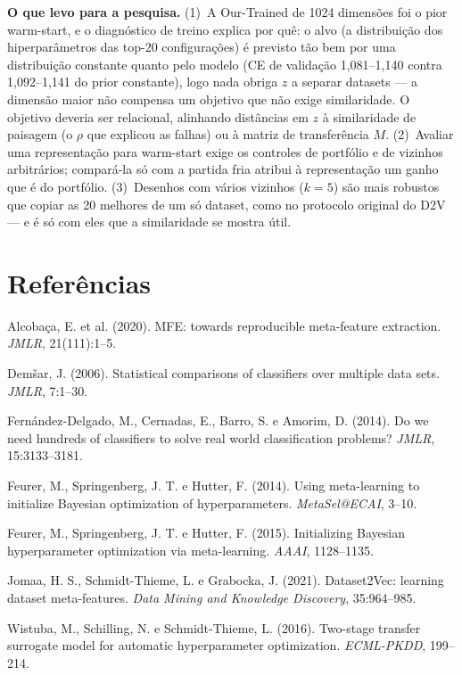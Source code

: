 \documentclass[10pt,a4paper]{article}
\begin{document}
\textbf{O que levo para a pesquisa.} (1)~A Our-Trained de 1024 dimensões foi o pior warm-start, e o diagnóstico de treino explica
por quê: o alvo (a distribuição dos hiperparâmetros das top-20 configurações) é previsto tão bem por uma distribuição constante
quanto pelo modelo (CE de validação 1,081--1,140 contra 1,092--1,141 do prior constante), logo nada obriga $z$ a separar datasets
--- a dimensão maior não compensa um objetivo que não exige similaridade. O objetivo deveria ser relacional, alinhando distâncias
em $z$ à similaridade de paisagem (o $\rho$ que explicou as falhas) ou à matriz de transferência $M$. (2)~Avaliar uma
representação para warm-start exige os controles de portfólio e de vizinhos arbitrários; compará-la só com a partida fria atribui
à representação um ganho que é do portfólio. (3)~Desenhos com vários vizinhos ($k = 5$) são mais robustos que copiar as 20
melhores de um só dataset, como no protocolo original do D2V --- e é só com eles que a similaridade se mostra útil.

\section*{Referências}
{\small
\setlength{\parskip}{1pt}
\setlength{\leftskip}{12pt}
\setlength{\parindent}{-12pt}

Alcobaça, E. et al. (2020). MFE: towards reproducible meta-feature extraction. \textit{JMLR}, 21(111):1--5.

Demšar, J. (2006). Statistical comparisons of classifiers over multiple data sets. \textit{JMLR}, 7:1--30.

Fernández-Delgado, M., Cernadas, E., Barro, S. e Amorim, D. (2014). Do we need hundreds of classifiers to solve real world
classification problems? \textit{JMLR}, 15:3133--3181.

Feurer, M., Springenberg, J. T. e Hutter, F. (2014). Using meta-learning to initialize Bayesian optimization of hyperparameters.
\textit{MetaSel@ECAI}, 3--10.

Feurer, M., Springenberg, J. T. e Hutter, F. (2015). Initializing Bayesian hyperparameter optimization via meta-learning.
\textit{AAAI}, 1128--1135.

Jomaa, H. S., Schmidt-Thieme, L. e Grabocka, J. (2021). Dataset2Vec: learning dataset meta-features. \textit{Data Mining and
Knowledge Discovery}, 35:964--985.

Wistuba, M., Schilling, N. e Schmidt-Thieme, L. (2016). Two-stage transfer surrogate model for automatic hyperparameter
optimization. \textit{ECML-PKDD}, 199--214.
\par}
\end{document}
